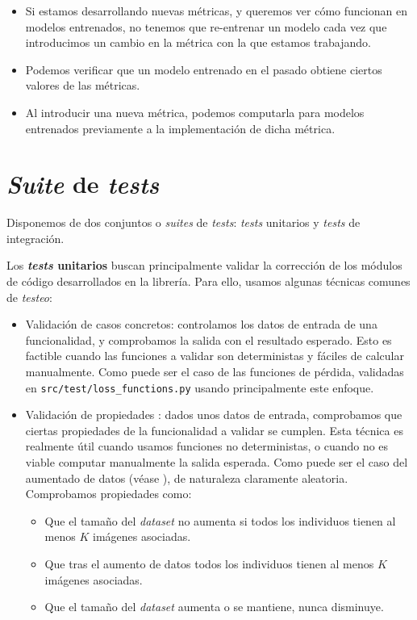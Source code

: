 \begin{itemize}
	\item Si estamos desarrollando nuevas métricas, y queremos ver cómo funcionan en modelos entrenados, no tenemos que re-entrenar un modelo cada vez que introducimos un cambio en la métrica con la que estamos trabajando.
	\item Podemos verificar que un modelo entrenado en el pasado obtiene ciertos valores de las métricas.
	\item Al introducir una nueva métrica, podemos computarla para modelos entrenados previamente a la implementación de dicha métrica.
\end{itemize}

\section{\textit{Suite} de \textit{tests}} \label{isec:test_suite}

Disponemos de dos conjuntos o \textit{suites} de \textit{tests}: \textit{tests} unitarios y \textit{tests} de integración.

Los \textbf{\textit{tests} unitarios} buscan principalmente validar la corrección de los módulos de código desarrollados en la librería. Para ello, usamos algunas técnicas comunes de \textit{testeo}:

\begin{itemize}
	\item Validación de casos concretos: controlamos los datos de entrada de una funcionalidad, y comprobamos la salida con el resultado esperado. Esto es factible cuando las funciones a validar son deterministas y fáciles de calcular manualmente. Como puede ser el caso de las funciones de pérdida, validadas en \lstinline{src/test/loss_functions.py} usando principalmente este enfoque.
	\item Validación de propiedades \cite{informatica:property_based_testing}: dados unos datos de entrada, comprobamos que ciertas propiedades de la funcionalidad a validar se cumplen. Esta técnica es realmente útil cuando usamos funciones no deterministas, o cuando no es viable computar manualmente la salida esperada. Como puede ser el caso del aumentado de datos (véase ), de naturaleza claramente aleatoria. Comprobamos propiedades como:

	      \begin{itemize}
		      \item Que el tamaño del \textit{dataset} no aumenta si todos los individuos tienen al menos $K$ imágenes asociadas.
		      \item Que tras el aumento de datos todos los individuos tienen al menos $K$ imágenes asociadas.
		      \item Que el tamaño del \textit{dataset} aumenta o se mantiene, nunca disminuye.
	      \end{itemize}

\end{itemize}

